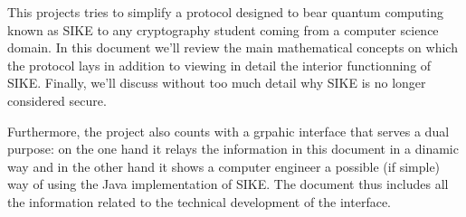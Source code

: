 
This projects tries to simplify a protocol designed to bear quantum computing known as SIKE to any cryptography student coming from a computer science domain. In this document we'll review the main mathematical concepts on which the protocol lays in addition to viewing in detail the interior functionning of SIKE. Finally, we'll discuss without too much detail why SIKE is no longer considered secure.

Furthermore, the project also counts with a grpahic interface that serves a dual purpose: on the one hand it relays the information in this document in a dinamic way and in the other hand it shows a computer engineer a possible (if simple) way of using the Java implementation of SIKE. The document thus includes all the information related to the technical development of the interface.